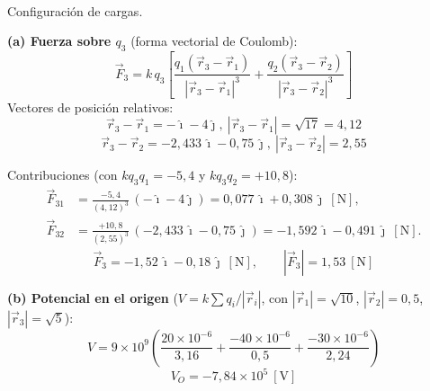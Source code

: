 \documentclass[12pt,letterpaper]{article}
\begin{document}
\noindent
\begin{minipage}[t]{0.36\textwidth}
\centering
\vspace{0pt}
\\[2pt]
{\scriptsize Configuraci\'on de cargas.}
\end{minipage}%
\hfill
\begin{minipage}[t]{0.60\textwidth}
\vspace{0pt}
\textbf{(a) Fuerza sobre $q_3$} (forma vectorial de Coulomb):
\[
    \vec F_3 = k\,q_3\!\left[\frac{q_1(\vec r_3-\vec r_1)}{|\vec r_3-\vec r_1|^3}
                          + \frac{q_2(\vec r_3-\vec r_2)}{|\vec r_3-\vec r_2|^3}\right]
\]
Vectores de posici\'on relativos:
\[
    \vec r_3-\vec r_1=-\hat\imath-4\hat\jmath,\ |\vec r_3-\vec r_1|=\sqrt{17}=4{,}12
\]
\[
    \vec r_3-\vec r_2=-2{,}433\,\hat\imath-0{,}75\,\hat\jmath,\ |\vec r_3-\vec r_2|=2{,}55
\]
\end{minipage}

\smallskip
\noindent Contribuciones (con $kq_3q_1=-5{,}4$ y $kq_3q_2=+10{,}8$):
\begin{align*}
    \vec F_{31} &= \frac{-5{,}4}{(4{,}12)^3}\,(-\hat\imath-4\hat\jmath) = 0{,}077\,\hat\imath + 0{,}308\,\hat\jmath\ [\text{N}],\\[2pt]
    \vec F_{32} &= \frac{+10{,}8}{(2{,}55)^3}\,(-2{,}433\,\hat\imath-0{,}75\,\hat\jmath) = -1{,}592\,\hat\imath - 0{,}491\,\hat\jmath\ [\text{N}].
\end{align*}
\[
    \boxed{\vec F_3 = -1{,}52\,\hat\imath - 0{,}18\,\hat\jmath\ [\text{N}],\qquad |\vec F_3| = 1{,}53\ [\text{N}]}
\]

\medskip
\noindent\textbf{(b) Potencial en el origen} ($V=k\sum q_i/|\vec r_i|$, con $|\vec r_1|=\sqrt{10}$,
$|\vec r_2|=0{,}5$, $|\vec r_3|=\sqrt{5}$):
\[
    V = 9\times10^{9}\!\left(\frac{20\times10^{-6}}{3{,}16} + \frac{-40\times10^{-6}}{0{,}5}
        + \frac{-30\times10^{-6}}{2{,}24}\right)
\]
\[
    \boxed{V_O = -7{,}84\times10^{5}\ [\text{V}]}
\]
\end{document}
